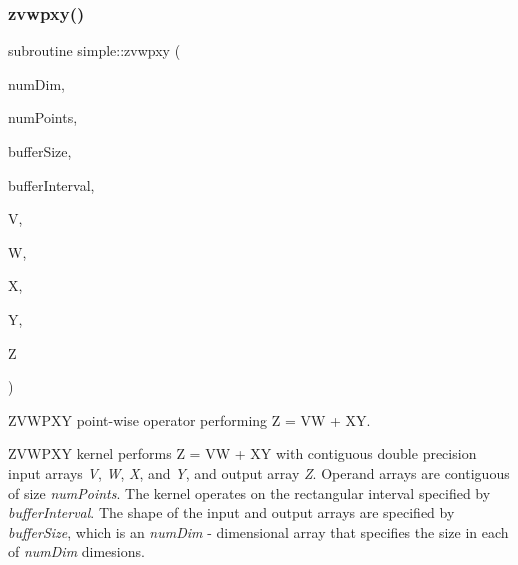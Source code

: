 \subsubsection{\texorpdfstring{zvwpxy()}{zvwpxy()}}
{\footnotesize\ttfamily subroutine simple\+::zvwpxy (\begin{DoxyParamCaption}\item[{integer(kind=4), intent(in)}]{num\+Dim,  }\item[{integer(kind=8), intent(in)}]{num\+Points,  }\item[{integer(kind=8), dimension(numdim), intent(in)}]{buffer\+Size,  }\item[{integer(kind=8), dimension(2$\ast$numdim), intent(in)}]{buffer\+Interval,  }\item[{real(kind=8), dimension(numpoints), intent(in)}]{V,  }\item[{real(kind=8), dimension(numpoints), intent(in)}]{W,  }\item[{real(kind=8), dimension(numpoints), intent(in)}]{X,  }\item[{real(kind=8), dimension(numpoints), intent(in)}]{Y,  }\item[{real(kind=8), dimension(numpoints), intent(out)}]{Z }\end{DoxyParamCaption})}



Z\+V\+W\+P\+XY point-\/wise operator performing Z = VW + XY. 

Z\+V\+W\+P\+XY kernel performs Z = VW + XY with contiguous double precision input arrays {\itshape V}, {\itshape W}, {\itshape X}, and {\itshape Y}, and output array {\itshape Z}. Operand arrays are contiguous of size {\itshape num\+Points}. The kernel operates on the rectangular interval specified by {\itshape buffer\+Interval}. The shape of the input and output arrays are specified by {\itshape buffer\+Size}, which is an {\itshape num\+Dim} -\/ dimensional array that specifies the size in each of {\itshape num\+Dim} dimesions.


